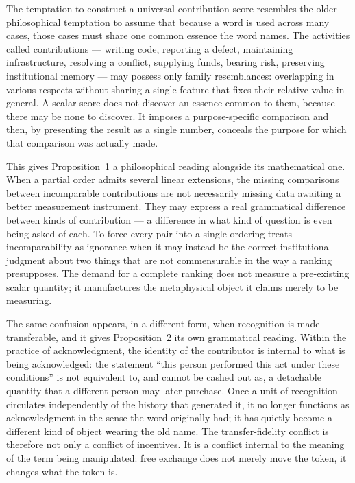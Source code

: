 \documentclass[11pt,oneside]{article}
\theoremstyle{plain}
\theoremstyle{definition}
\begin{document}
The temptation to construct a universal contribution score resembles the older philosophical temptation to assume that because a word is used across many cases, those cases must share one common essence the word names. The activities called contributions --- writing code, reporting a defect, maintaining infrastructure, resolving a conflict, supplying funds, bearing risk, preserving institutional memory --- may possess only family resemblances: overlapping in various respects without sharing a single feature that fixes their relative value in general. A scalar score does not discover an essence common to them, because there may be none to discover. It imposes a purpose-specific comparison and then, by presenting the result as a single number, conceals the purpose for which that comparison was actually made.

This gives Proposition~1 a philosophical reading alongside its mathematical one. When a partial order admits several linear extensions, the missing comparisons between incomparable contributions are not necessarily missing data awaiting a better measurement instrument. They may express a real grammatical difference between kinds of contribution --- a difference in what kind of question is even being asked of each. To force every pair into a single ordering treats incomparability as ignorance when it may instead be the correct institutional judgment about two things that are not commensurable in the way a ranking presupposes. The demand for a complete ranking does not measure a pre-existing scalar quantity; it manufactures the metaphysical object it claims merely to be measuring.

The same confusion appears, in a different form, when recognition is made transferable, and it gives Proposition~2 its own grammatical reading. Within the practice of acknowledgment, the identity of the contributor is internal to what is being acknowledged: the statement \enquote{this person performed this act under these conditions} is not equivalent to, and cannot be cashed out as, a detachable quantity that a different person may later purchase. Once a unit of recognition circulates independently of the history that generated it, it no longer functions as acknowledgment in the sense the word originally had; it has quietly become a different kind of object wearing the old name. The transfer-fidelity conflict is therefore not only a conflict of incentives. It is a conflict internal to the meaning of the term being manipulated: free exchange does not merely move the token, it changes what the token is.
\end{document}
